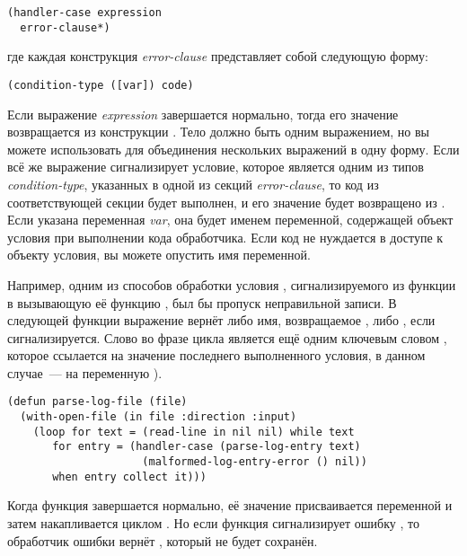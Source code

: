 \begin{lstlisting}
(handler-case expression
  error-clause*)
\end{lstlisting}

\noindent{}где каждая конструкция \textit{error-clause} представляет собой следующую форму:

\begin{lstlisting}
(condition-type ([var]) code)
\end{lstlisting}

Если выражение \textit{expression} завершается нормально, тогда его значение возвращается
из конструкции . Тело  должно быть одним выражением,
но вы можете использовать  для объединения нескольких выражений в одну
форму. Если всё же выражение сигнализирует условие, которое является одним из типов
\textit{condition-type}, указанных в одной из секций \textit{error-clause}, то код из
соответствующей секции будет выполнен, и его значение будет возвращено из
. Если указана переменная \textit{var}, она будет именем переменной,
содержащей объект условия при выполнении кода обработчика. Если код не нуждается в доступе
к объекту условия, вы можете опустить имя переменной.

Например, одним из способов обработки условия ,
сигнализируемого из функции  в вызывающую её функцию
, был бы пропуск неправильной записи. В следующей функции выражение
 вернёт либо имя, возвращаемое , либо ,
если  сигнализируется. Слово  во фразе
 цикла  является ещё одним ключевым словом ,
которое ссылается на значение последнего выполненного условия, в данном случае~--- на
переменную ).

\begin{lstlisting}
(defun parse-log-file (file)
  (with-open-file (in file :direction :input)
    (loop for text = (read-line in nil nil) while text
       for entry = (handler-case (parse-log-entry text)
                     (malformed-log-entry-error () nil))
       when entry collect it)))
\end{lstlisting}

Когда функция  завершается нормально, её значение присваивается
переменной  и затем накапливается циклом . Но если функция
 сигнализирует ошибку , то
обработчик ошибки вернёт , который не будет сохранён.

